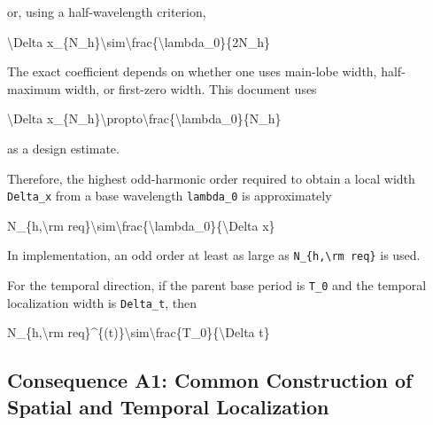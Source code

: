\documentclass[
  a4paper,
]{article}
\newenvironment{Shaded}{}{}
\newcommand{\NormalTok}[1]{#1}
\begin{document}
or, using a half-wavelength criterion,

\begin{Shaded}
\begin{Highlighting}[]
\NormalTok{\textbackslash{}Delta x\_\{N\_h\}\textbackslash{}sim\textbackslash{}frac\{\textbackslash{}lambda\_0\}\{2N\_h\}}
\end{Highlighting}
\end{Shaded}

The exact coefficient depends on whether one uses main-lobe width,
half-maximum width, or first-zero width. This document uses

\begin{Shaded}
\begin{Highlighting}[]
\NormalTok{\textbackslash{}Delta x\_\{N\_h\}\textbackslash{}propto\textbackslash{}frac\{\textbackslash{}lambda\_0\}\{N\_h\}}
\end{Highlighting}
\end{Shaded}

as a design estimate.

Therefore, the highest odd-harmonic order required to obtain a local
width \texttt{Delta\_x} from a base wavelength \texttt{lambda\_0} is
approximately

\begin{Shaded}
\begin{Highlighting}[]
\NormalTok{N\_\{h,\textbackslash{}rm req\}\textbackslash{}sim\textbackslash{}frac\{\textbackslash{}lambda\_0\}\{\textbackslash{}Delta x\}}
\end{Highlighting}
\end{Shaded}

In implementation, an odd order at least as large as
\texttt{N\_\{h,\textbackslash{}rm\ req\}} is used.

For the temporal direction, if the parent base period is \texttt{T\_0}
and the temporal localization width is \texttt{Delta\_t}, then

\begin{Shaded}
\begin{Highlighting}[]
\NormalTok{N\_\{h,\textbackslash{}rm req\}\^{}\{(t)\}\textbackslash{}sim\textbackslash{}frac\{T\_0\}\{\textbackslash{}Delta t\}}
\end{Highlighting}
\end{Shaded}

\subsection{Consequence A1: Common Construction of Spatial and Temporal
Localization}\label{consequence-a1-common-construction-of-spatial-and-temporal-localization}
\end{document}
